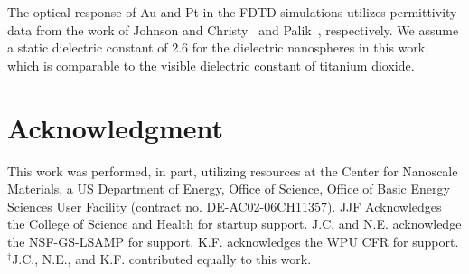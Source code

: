 \documentclass[journal=jpclcd,manuscript=letter]{achemso}
\begin{document}
The optical response of Au and Pt in the FDTD simulations utilizes permittivity data from the work of Johnson and Christy~\cite{JC_PRB_1972} and Palik~\cite{Palik}, respectively.  We assume a static dielectric constant of 2.6 for
the dielectric nanospheres in this work, which is comparable to the visible dielectric constant of titanium dioxide. 

\section{Acknowledgment}
This work was performed, in part, utilizing resources at
the Center for Nanoscale Materials, a US Department of Energy, Office of Science, Office of
Basic Energy Sciences User Facility (contract no. DE-AC02-06CH11357).
JJF Acknowledges the College of Science and Health for startup support.
J.C. and N.E. acknowledge the NSF-GS-LSAMP for support.  K.F. acknowledges the WPU CFR for support.
$^{\dagger}$J.C., N.E., and K.F. contributed equally to this work.
 
\end{document}
